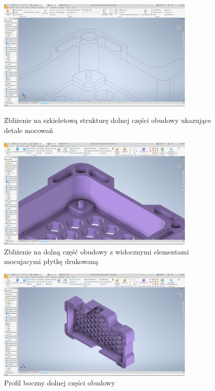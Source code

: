 \clearpage
\begin{figure}[htbp]
\centering
	\includegraphics[width=0.85\textwidth]{root/enclosure_closeup_wireframe.png}
	\caption{Zbliżenie na szkieletową strukturę dolnej części obudowy ukazujące detale mocowań}
	\vspace{1cm}
	\includegraphics[width=0.85\textwidth]{root/enclosure_top_closeup.png}
	\caption{Zbliżenie na dolną część obudowy z widocznymi elementami mocujacymi płytkę drukowaną}
\end{figure}

\clearpage
\begin{figure}[htbp]
\centering
	\includegraphics[width=0.85\textwidth]{root/enclosure_side.png}
	\caption{Profil boczny dolnej części obudowy}
\end{figure}

